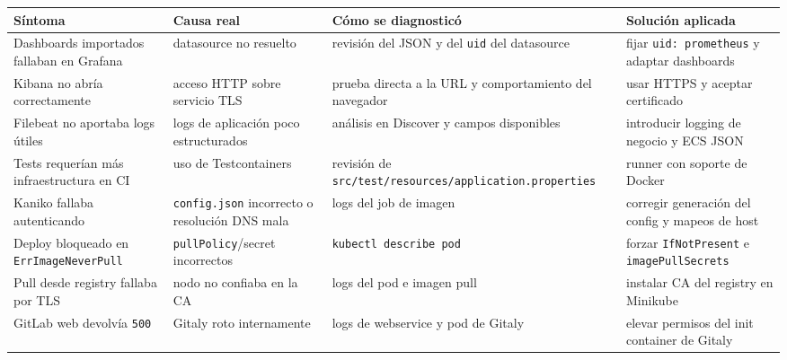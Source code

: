 \documentclass[
a4paper,
12pt]{report}
\begin{document}
{\def\LTcaptype{table} %
\begin{longtable}[]{@{}
  >{\raggedright\arraybackslash}p{}
  >{\raggedright\arraybackslash}p{}
  >{\raggedright\arraybackslash}p{}
  >{\raggedright\arraybackslash}p{}@{}}
\toprule\noalign{}
\begin{minipage}[b]{\linewidth}\raggedright
Síntoma
\end{minipage} & \begin{minipage}[b]{\linewidth}\raggedright
Causa real
\end{minipage} & \begin{minipage}[b]{\linewidth}\raggedright
Cómo se diagnosticó
\end{minipage} & \begin{minipage}[b]{\linewidth}\raggedright
Solución aplicada
\end{minipage} \\
\midrule\noalign{}
\endhead
\bottomrule\noalign{}
\endlastfoot
Dashboards importados fallaban en Grafana & datasource no resuelto &
revisión del JSON y del \texttt{uid} del datasource & fijar
\texttt{uid:\ prometheus} y adaptar dashboards \\
Kibana no abría correctamente & acceso HTTP sobre servicio TLS & prueba
directa a la URL y comportamiento del navegador & usar HTTPS y aceptar
certificado \\
Filebeat no aportaba logs útiles & logs de aplicación poco estructurados
& análisis en Discover y campos disponibles & introducir logging de
negocio y ECS JSON \\
Tests requerían más infraestructura en CI & uso de Testcontainers &
revisión de \texttt{src/test/resources/application.properties} & runner
con soporte de Docker \\
Kaniko fallaba autenticando & \texttt{config.json} incorrecto o
resolución DNS mala & logs del job de imagen & corregir generación del
config y mapeos de host \\
Deploy bloqueado en \texttt{ErrImageNeverPull} &
\texttt{pullPolicy}/secret incorrectos & \texttt{kubectl\ describe\ pod}
& forzar \texttt{IfNotPresent} e \texttt{imagePullSecrets} \\
Pull desde registry fallaba por TLS & nodo no confiaba en la CA & logs
del pod e imagen pull & instalar CA del registry en Minikube \\
GitLab web devolvía \texttt{500} & Gitaly roto internamente & logs de
webservice y pod de Gitaly & elevar permisos del init container de
Gitaly \\
\end{longtable}
}
\end{document}
